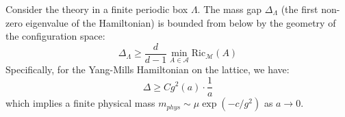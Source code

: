 \begin{theorem}
\label{thm:orbit_space_bound}
Consider the theory in a finite periodic box $\Lambda$. The mass gap $\Delta_\Lambda$ (the first non-zero eigenvalue of the Hamiltonian) is bounded from below by the geometry of the configuration space:
\begin{equation}
\Delta_\Lambda \ge \frac{d}{d-1} \min_{A \in \mathcal{A}} \text{Ric}_{\mathcal{M}}(A)
\end{equation}
Specifically, for the Yang-Mills Hamiltonian on the lattice, we have:
\begin{equation}
\Delta \ge C g^2(a) \cdot \frac{1}{a}
\end{equation}
which implies a finite physical mass $m_{phys} \sim \mu \exp(-c/g^2)$ as $a \to 0$.
\end{theorem}

